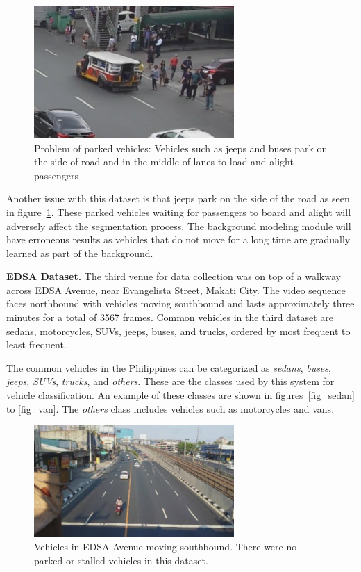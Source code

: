 \documentclass[conference]{IEEEtran}
\begin{document}
\begin{figure}[!ht]
\centering
\includegraphics[width=3in]{dataset2_jeeps.png}
\caption{Problem of parked vehicles: Vehicles such as jeeps and buses park on the side of road and in the middle of lanes to load and alight passengers}
\label{fig_jeeps}
\end{figure}

Another issue with this dataset is that jeeps park on the side of the road as seen in figure~\ref{fig_jeeps}.  These parked vehicles waiting for passengers to board and alight will adversely affect the segmentation process. The background modeling module will have erroneous results as vehicles that do not move for a long time are gradually learned as part of the background.

\textbf{EDSA Dataset.} The third venue for data collection was on top of a walkway across EDSA Avenue, near Evangelista Street, Makati City. The video sequence faces northbound with vehicles moving southbound and lasts approximately three minutes for a total of 3567 frames. Common vehicles in the third dataset are sedans, motorcycles, SUVs, jeeps, buses, and trucks, ordered by most frequent to least frequent.


The common vehicles in the Philippines can be categorized as \textit{sedans}, \textit{buses}, \textit{jeeps}, \textit{SUVs}, \textit{trucks}, and \textit{others}. These are the classes used by this system for vehicle classification. An example of these classes are shown in figures~\ref{fig_sedan} to \ref{fig_van}. The \textit{others} class includes vehicles such as motorcycles and vans.


\begin{figure}[!ht]
\centering
\includegraphics[width=3in]{dataset3_sample.png}
\caption{Vehicles in EDSA Avenue moving southbound. There were no parked or stalled vehicles in this dataset.}
\label{fig_edsa}
\end{figure}
\end{document}
